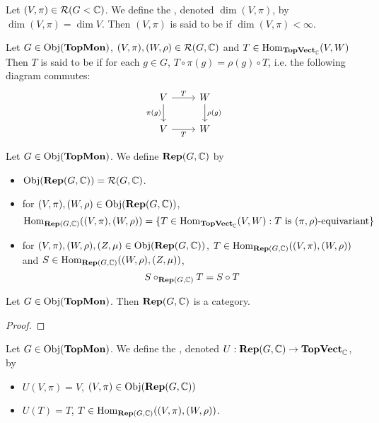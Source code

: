 \documentclass{book}
\begin{document}
	\begin{defn}
		 Let $(V, \pi) \in \MR(G< \C)$. We define the , denoted $\dim (V, \pi)$, by $\dim (V, \pi) = \dim V$. Then $(V, \pi)$ is said to be  if $\dim (V, \pi) < \infty$. 
	\end{defn}

	\begin{defn}
		Let $G \in \Obj(\TopMon)$, $(V, \pi), (W, \rho) \in \MR(G, \C)$ and $T\in \Hom_{\TopVect_{\C}}(V, W)$ Then $T$ is said to be  if for each $g \in G$, $T \circ \pi(g) = \rho(g) \circ T$, i.e. the following diagram commutes:
		\[
		\begin{tikzcd}
			V \arrow[r, "T"] \arrow[d, "\pi(g)"']  & W  \arrow[d, "\rho(g)"] \\
			V \arrow[r, "T"']                   & W
		\end{tikzcd}
		\]
	\end{defn}

	\begin{defn} \ld{13009}
		Let $G \in \Obj(\TopMon)$. We define $\Rep(G, \C)$ by 
		\begin{itemize}
			\item $\Obj(\Rep(G, \C)) = \MR(G, \C)$.
			\item for $(V, \pi),(W, \rho) \in \Obj(\Rep(G, \C))$, 
			$$\Hom_{\Rep(G, \C)}((V, \pi), (W, \rho)) = \{T \in \Hom_{\TopVect_{\C}}(V, W): T \text{ is $(\pi, \rho)$-equivariant} \}$$
			\item for $(V, \pi), (W, \rho), (Z, \mu) \in \Obj(\Rep(G, \C))$, $T \in \Hom_{\Rep(G, \C)}((V, \pi), (W, \rho))$ and $S \in  \Hom_{\Rep(G, \C)}((W, \rho), (Z, \mu))$, $$S \circ_{\Rep(G, \C)} T = S \circ T$$
		\end{itemize}
	\end{defn}
	
	\begin{ex}
		Let $G \in \Obj(\TopMon)$. Then $\Rep(G, \C)$ is a category.
	\end{ex}

	\begin{proof}
		
	\end{proof}

	\begin{defn}
		Let $G \in \Obj(\TopMon)$. We define the , denoted $U: \Rep(G, \C) \rightarrow \TopVect_{\C}$, by 
		\begin{itemize}
			\item $U (V, \pi) = V$, \quad $(V, \pi) \in \Obj(\Rep(G, \C))$
			\item $U (T) = T$, \quad $T \in \Hom_{\Rep(G, \C)}((V, \pi), (W, \rho))$.
		\end{itemize}
	\end{defn}
\end{document}
